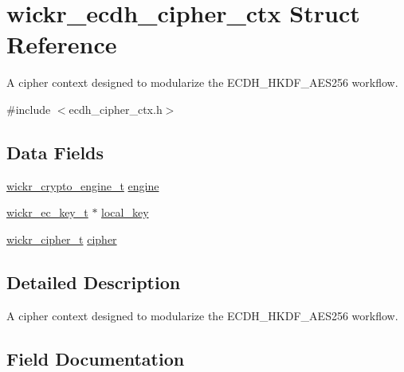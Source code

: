 \hypertarget{structwickr__ecdh__cipher__ctx}{}\section{wickr\+\_\+ecdh\+\_\+cipher\+\_\+ctx Struct Reference}
\label{structwickr__ecdh__cipher__ctx}


A cipher context designed to modularize the E\+C\+D\+H\+\_\+\+H\+K\+D\+F\+\_\+\+A\+E\+S256 workflow.  




{\ttfamily \#include $<$ecdh\+\_\+cipher\+\_\+ctx.\+h$>$}

\subsection*{Data Fields}
\begin{DoxyCompactItemize}
\item 
\mbox{\hyperlink{structwickr__crypto__engine}{wickr\+\_\+crypto\+\_\+engine\+\_\+t}} \mbox{\hyperlink{structwickr__ecdh__cipher__ctx_a4d953a0c8d6302db63f2fce624e6ffc2}{engine}}
\item 
\mbox{\hyperlink{structwickr__ec__key}{wickr\+\_\+ec\+\_\+key\+\_\+t}} $\ast$ \mbox{\hyperlink{structwickr__ecdh__cipher__ctx_ad9389a9efc31ac0516d9aebeb1ac6301}{local\+\_\+key}}
\item 
\mbox{\hyperlink{structwickr__cipher}{wickr\+\_\+cipher\+\_\+t}} \mbox{\hyperlink{structwickr__ecdh__cipher__ctx_a15e7d01b0e07501b572c11bde1c2e56e}{cipher}}
\end{DoxyCompactItemize}


\subsection{Detailed Description}
A cipher context designed to modularize the E\+C\+D\+H\+\_\+\+H\+K\+D\+F\+\_\+\+A\+E\+S256 workflow. 

\subsection{Field Documentation}
\mbox{\label{structwickr__ecdh__cipher__ctx_a15e7d01b0e07501b572c11bde1c2e56e}} 
